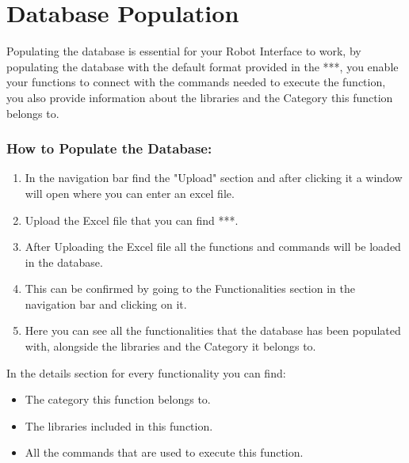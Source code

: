 %
%
%



\chapter{Database Population}
Populating the database is essential for your Robot Interface to work,
by populating the database with the default format provided in the ***,
you enable your functions to connect with the commands needed to execute the function, you also provide information about the libraries and the Category this function belongs to.\\
\subsection{How to Populate the Database:}
\begin{enumerate}
	\item In the navigation bar find the "Upload" section and after clicking it a window will open where you can enter an excel file.
	\item Upload the Excel file that you can find ***.
	\item After Uploading the Excel file all the functions and commands will be loaded in the database.
	\item This can be confirmed by going to the Functionalities section in the navigation bar and clicking on it.
	\item Here you can see all the functionalities that the database has been populated with, alongside the libraries and the Category it belongs to.
\end{enumerate}
In the details section for every functionality you can find:
\begin{itemize}
	\item The category this function belongs to.
	\item The libraries included in this function.
	\item All the commands that are used to execute this function.
\end{itemize}
